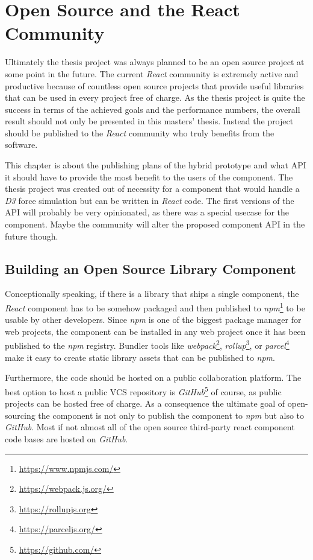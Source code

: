 \chapter{Open Source and the React Community}
\label{cha:opensource}

Ultimately the thesis project was always planned to be an open source project at some point in the future. The current \emph{React} community is extremely active and productive because of countless open source projects that provide useful libraries that can be used in every project free of charge. As the thesis project is quite the success in terms of the achieved goals and the performance numbers, the overall result should not only be presented in this masters' thesis. Instead the project should be published to the \emph{React} community who truly benefits from the software.

This chapter is about the publishing plans of the hybrid prototype and what API it should have to provide the most benefit to the users of the component. The thesis project was created out of necessity for a component that would handle a \emph{D3} force simulation but can be written in \emph{React} code. The first versions of the API will probably be very opinionated, as there was a special usecase for the component. Maybe the community will alter the proposed component API in the future though.

\section{Building an Open Source Library Component}

Conceptionally speaking, if there is a library that ships a single component, the \emph{React} component has to be somehow packaged and then published to \emph{npm}\footnote{\url{https://www.npmjs.com/}} to be usable by other developers. Since \emph{npm} is one of the biggest package manager for web projects, the component can be installed in any web project once it has been published to the \emph{npm} registry. Bundler tools like \emph{webpack}\footnote{\url{https://webpack.js.org/}}, \emph{rollup}\footnote{\url{https://rollupjs.org}}, or \emph{parcel}\footnote{\url{https://parceljs.org/}} make it easy to create static library assets that can be published to \emph{npm}.

Furthermore, the code should be hosted on a public collaboration platform. The best option to host a public VCS repository is \emph{GitHub}\footnote{\url{https://github.com/}} of course, as public projects can be hosted free of charge. As a consequence the ultimate goal of open-sourcing the component is not only to publish the component to \emph{npm} but also to \emph{GitHub}. Most if not almost all of the open source third-party react component code bases are hosted on \emph{GitHub}.

